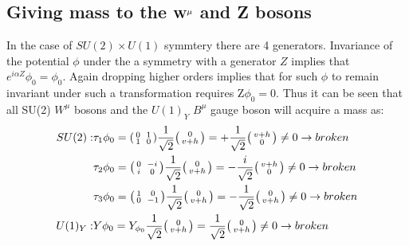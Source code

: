\subsection{Giving mass to the $\bf{W^{\mu}}$ and Z bosons}
In the case of $SU(2)\times U(1)$ symmtery  there are 4 generators.
Invariance of the potential $\phi$ under the a symmetry with a generator $Z$ implies that $e^{i\alpha Z}\phi_{0} = \phi_{0}$.  Again dropping higher orders implies that for such $\phi$ to remain invariant under such a transformation requires Z$\phi_{0} = 0$. Thus it can be seen that all SU(2) $W^{\mu}$  bosons and the $U(1)_{Y}$ $B^{\mu}$ gauge boson will acquire a mass as:
\begin{equation}
  \begin{split}
    SU(2):
    &\tau_{1}\phi_{0} =\begin{psmallmatrix}0&&1\\1&&0\end{psmallmatrix}\frac{1}{\sqrt{2}} \begin{psmallmatrix}0\\v+h\end{psmallmatrix}= +\frac{1}{\sqrt{2}}\begin{psmallmatrix}v+h\\0\end{psmallmatrix}\neq 0 \to broken\\
    &\tau_{2}\phi_{0} =\begin{psmallmatrix}0&&-i\\i&&0\end{psmallmatrix}\frac{1}{\sqrt{2}}\begin{psmallmatrix}0\\v+h\end{psmallmatrix}= -\frac{i}{\sqrt{2}}\begin{psmallmatrix}v+h\\0\end{psmallmatrix}\neq 0 \to broken\\
    &\tau_{3}\phi_{0} =\begin{psmallmatrix}1&&0\\0&&-1\end{psmallmatrix}\frac{1}{\sqrt{2}}\begin{psmallmatrix}0\\v+h\end{psmallmatrix}= -\frac{1}{\sqrt{2}}\begin{psmallmatrix}0\\v+h\end{psmallmatrix}\neq 0 \to broken\\
    U(1)_{Y}:
    &Y\phi_{0} =         Y_{\phi_{0}}\frac{1}{\sqrt{2}} \begin{psmallmatrix}0\\v+h\end{psmallmatrix}= \frac{1}{\sqrt{2}}\begin{psmallmatrix}0\\v+h\end{psmallmatrix}\neq 0 \to broken\\
  \end{split}
\end{equation}
